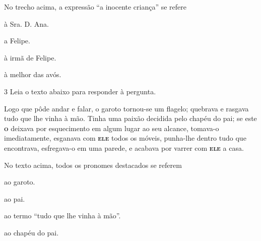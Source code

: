 No trecho acima, a expressão ``a inocente criança'' se refere

\begin{multicols}{2}
\begin{escolha}
  
  \item à Sra. D. Ana.
  
  \item a Felipe.
  
  \item à irmã de Felipe. 
  
  \item à melhor das avós.

\end{escolha}
\end{multicols}

\num{3} Leia o texto abaixo para responder à pergunta.

\begin{myquote}

Logo que pôde andar e falar, o garoto tornou-se um flagelo; quebrava e rasgava tudo
que lhe vinha à mão. Tinha uma paixão decidida pelo chapéu do pai;
se este \textsc{\textbf{o}} deixava por esquecimento em algum lugar ao seu alcance, tomava-o
imediatamente, esganava com \textsc{\textbf{ele}} todos os móveis, punha-lhe dentro tudo que
encontrava, esfregava-o em uma parede, e acabava por varrer com \textsc{\textbf{ele}} a casa.


\end{myquote}


No texto acima, todos os pronomes destacados se referem 

\begin{multicols}{2}
\begin{escolha}

  \item ao garoto.

  \item ao pai. 

  \item ao termo ``tudo que lhe vinha à mão''. 

  \item ao chapéu do pai.

\end{escolha}
\end{multicols}


